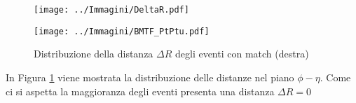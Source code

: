 \begin{figure}[t]
  \centering
  \begin{minipage}[b]{0.51\textwidth}
    \centering
    \texttt{[image: ../Immagini/DeltaR.pdf]} 
    \end{minipage}
    \hfill 
    \begin{minipage}[b]{0.48\textwidth}
      \centering
      \texttt{[image: ../Immagini/BMTF\_PtPtu.pdf]} 
    \end{minipage}
    \caption{Distribuzione della distanza $\Delta R$ degli eventi con match (destra)}
  \label{fig:DeltaR}
\end{figure}

In Figura \ref{fig:DeltaR} viene mostrata la distribuzione delle distanze nel piano $\phi - \eta$. Come ci si aspetta la maggioranza degli eventi presenta una distanza $\Delta R = 0$




